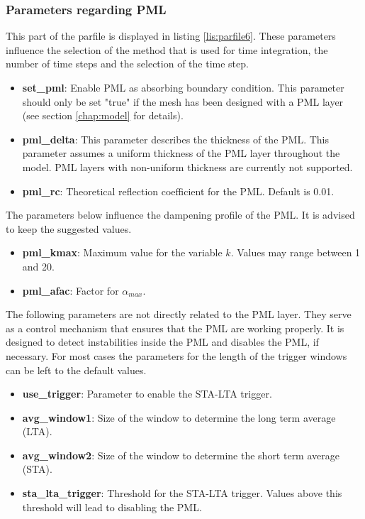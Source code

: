		\subsubsection{Parameters regarding PML}
			This part of the parfile is displayed in listing \ref{lis:parfile6}. These parameters influence the selection of the method that is used for time integration, the number of time steps and the selection of the time step. 
			 
    
    	\begin{itemize}
    	 	\item \textbf{set\_pml}: Enable PML as absorbing boundary condition. This parameter should only be set "true" if the mesh has been designed with a PML layer (see section \ref{chap:model} for details).
    	 	\item \textbf{pml\_delta}: This parameter describes the thickness of the PML. This parameter assumes a uniform thickness of the PML layer throughout the model. PML layers with non-uniform thickness are currently not supported.
    	 	\item \textbf{pml\_rc}: Theoretical reflection coefficient for the PML. Default is 0.01.
    	 	
    	\end{itemize}
			The parameters below influence the dampening profile of the PML. It is advised to keep the suggested values.
			
			\begin{itemize}
				\item \textbf{pml\_kmax}: Maximum value for the variable $k$. Values may range between 1 and 20.
				\item \textbf{pml\_afac}: Factor for $\alpha_{max}$.
			\end{itemize}
			
			The following parameters are not directly related to the PML layer. They serve as a control mechanism that ensures that the PML are working properly. It is designed to detect instabilities inside the PML and disables the PML, if necessary. For most cases the parameters for the length of the trigger windows can be left to the default values.
			
			\begin{itemize}
				\item \textbf{use\_trigger}: Parameter to enable the STA-LTA trigger. 
				\item \textbf{avg\_window1}: Size of the window to determine the long term average (LTA).
				\item \textbf{avg\_window2}: Size of the window to determine the short term average (STA).
				\item \textbf{sta\_lta\_trigger}: Threshold for the STA-LTA trigger. Values above this threshold will lead to disabling the PML.
			\end{itemize}
		
